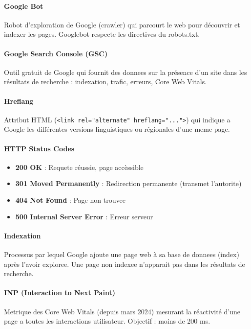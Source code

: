 \paragraph*{Google Bot}
Robot d'exploration de Google (crawler) qui parcourt le web pour découvrir et indexer les pages. Googlebot respecte les directives du robots.txt.

\paragraph*{Google Search Console (GSC)}
Outil gratuit de Google qui fournit des donnees sur la présence d'un site dans les résultats de recherche : indexation, trafic, erreurs, Core Web Vitals.

\paragraph*{Hreflang}
Attribut HTML (\texttt{<link rel="alternate" hreflang="...">}) qui indique a Google les différentes versions linguistiques ou régionales d'une meme page.

\paragraph*{HTTP Status Codes}
\begin{itemize}
    \item \textbf{200 OK} : Requete réussie, page accèssible
    \item \textbf{301 Moved Permanently} : Redirection permanente (transmet l'autorite)
    \item \textbf{404 Not Found} : Page non trouvee
    \item \textbf{500 Internal Server Error} : Erreur serveur
\end{itemize}

\paragraph*{Indexation}
Processus par lequel Google ajoute une page web à sa base de donnees (index) après l'avoir exploree. Une page non indexee n'apparait pas dans les résultats de recherche.

\paragraph*{INP (Interaction to Next Paint)}
Metrique des Core Web Vitals (depuis mars 2024) mesurant la réactivité d'une page a toutes les interactions utilisateur. Objectif : moins de 200 ms.

